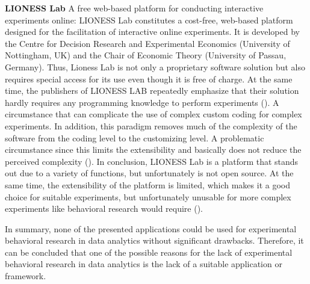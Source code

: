 \textbf{LIONESS Lab} A free web-based platform for conducting interactive experiments online:
LIONESS Lab constitutes a cost-free, web-based platform designed for the facilitation of interactive online experiments. It is developed by the Centre for Decision Research and Experimental Economics (University of Nottingham, UK) and the Chair of Economic Theory (University of Passau, Germany). Thus, Lioness Lab is not only a proprietary software solution but also requires special access for its use even though it is free of charge. At the same time, the publishers of LIONESS LAB repeatedly emphasize that their solution hardly requires any programming knowledge to perform experiments (\cite{Giamattei.2020}). A circumstance that can complicate the use of complex custom coding for complex experiments. In addition, this paradigm removes much of the complexity of the software from the coding level to the customizing level. A problematic circumstance since this limits the extensibility and basically does not reduce the perceived complexity (\cite{Chou.2008}). In conclusion, LIONESS Lab is a platform that stands out due to a variety of functions, but unfortunately is not open source. At the same time, the extensibility of the platform is limited, which makes it a good choice for suitable experiments, but unfortunately unusable for more complex experiments like behavioral research would require (\cite{Giamattei.2020}). 

In summary, none of the presented applications could be used for experimental behavioral research in data analytics without significant drawbacks. Therefore, it can be concluded that one of the possible reasons for the lack of experimental behavioral research in data analytics is the lack of a suitable application or framework.

